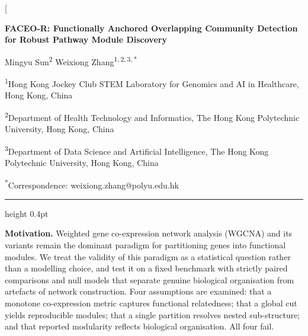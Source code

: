 \documentclass[twocolumn,10pt,letterpaper]{article}
\begin{document}
\twocolumn[{
\begin{center}
{\LARGE\bfseries FACEO-R: Functionally Anchored Overlapping Community Detection for
Robust Pathway Module Discovery\par}
\vspace{0.85em}
{\large Mingyu Sun\textsuperscript{2} \quad Weixiong Zhang\textsuperscript{1,\,2,\,3,\,*}\par}
\vspace{0.28em}
{\normalsize\textsuperscript{1}Hong Kong Jockey Club STEM Laboratory for Genomics and AI
in Healthcare, Hong Kong, China\par}
{\normalsize\textsuperscript{2}Department of Health Technology and Informatics, The Hong
Kong Polytechnic University, Hong Kong, China\par}
{\normalsize\textsuperscript{3}Department of Data Science and Artificial Intelligence,
The Hong Kong Polytechnic University, Hong Kong, China\par}
{\normalsize\textsuperscript{*}Correspondence: weixiong.zhang@polyu.edu.hk\par}
\end{center}
\vspace{0.35em}
\hrule height 0.4pt
\vspace{0.60em}
\begin{minipage}{1.0\textwidth}
\normalsize
\setlength{\parindent}{0pt}
\setlength{\parskip}{4pt}
\noindent\textbf{Motivation.} Weighted gene co-expression network analysis (WGCNA) and its
variants remain the dominant paradigm for partitioning genes into functional modules.
We treat the validity of this paradigm as a statistical question rather than a modelling
choice, and test it on a fixed benchmark with strictly paired comparisons and null models
that separate genuine biological organisation from artefacts of network construction. Four
assumptions are examined: that a monotone co-expression metric captures functional
relatedness; that a global cut yields reproducible modules; that a single partition resolves
nested sub-structure; and that reported modularity reflects biological organisation. All
four fail.


\end{minipage}}
\end{document}
